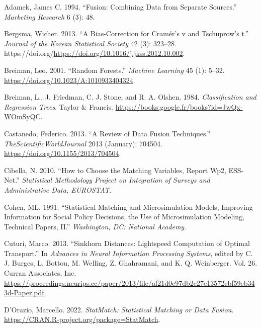 \hypertarget{refs}{}
\begin{CSLReferences}{1}{0}
\leavevmode{}%
Adamek, James C. 1994. {``Fusion: Combining Data from Separate Sources.''} \emph{Marketing Research} 6 (3): 48.

\leavevmode{}%
Bergsma, Wicher. 2013. {``A Bias-Correction for Cramér's v and Tschuprow's t.''} \emph{Journal of the Korean Statistical Society} 42 (3): 323--28. https://doi.org/\url{https://doi.org/10.1016/j.jkss.2012.10.002}.

\leavevmode{}%
Breiman, Leo. 2001. {``Random Forests.''} \emph{Machine Learning} 45 (1): 5--32. \url{https://doi.org/10.1023/A:1010933404324}.

\leavevmode{}%
Breiman, L., J. Friedman, C. J. Stone, and R. A. Olshen. 1984. \emph{Classification and Regression Trees}. Taylor \& Francis. \url{https://books.google.fr/books?id=JwQx-WOmSyQC}.

\leavevmode{}%
Castanedo, Federico. 2013. {``A Review of Data Fusion Techniques.''} \emph{TheScientificWorldJournal} 2013 (January): 704504. \url{https://doi.org/10.1155/2013/704504}.

\leavevmode{}%
Cibella, N. 2010. {``How to Choose the Matching Variables, Report Wp2, ESS-Net.''} \emph{Statistical Methodology Project on Integration of Surveys and Administrative Data, EUROSTAT}.

\leavevmode{}%
Cohen, ML. 1991. {``Statistical Matching and Microsimulation Models, Improving Information for Social Policy Decisions, the Use of Microsimulation Modeling, Technical Papers, II.''} \emph{Washington, DC: National Academy}.

\leavevmode{}%
Cuturi, Marco. 2013. {``Sinkhorn Distances: Lightspeed Computation of Optimal Transport.''} In \emph{Advances in Neural Information Processing Systems}, edited by C. J. Burges, L. Bottou, M. Welling, Z. Ghahramani, and K. Q. Weinberger. Vol. 26. Curran Associates, Inc. \url{https://proceedings.neurips.cc/paper/2013/file/af21d0c97db2e27e13572cbf59eb343d-Paper.pdf}.

\leavevmode{}%
D'Orazio, Marcello. 2022. \emph{StatMatch: Statistical Matching or Data Fusion}. \url{https://CRAN.R-project.org/package=StatMatch}.


\end{CSLReferences}
